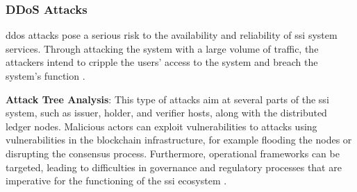 \subsubsection{DDoS Attacks}

\gls{ddos} attacks pose a serious risk to the availability and reliability of \gls{ssi} system services. Through attacking the system with a large 
volume of traffic, the attackers intend to cripple the users’ access to the system and breach the system’s function \cite{CyberSecurity}.

\textbf{Attack Tree Analysis}: This type of attacks aim at several parts of the \gls{ssi} system, such as issuer, holder, and verifier hosts, along with the distributed ledger nodes. 
Malicious actors can exploit vulnerabilities to attacks using vulnerabilities in the blockchain infrastructure, for example flooding the nodes or disrupting the consensus 
process. Furthermore, operational frameworks can be targeted, leading to difficulties in governance and regulatory processes that are imperative for the functioning of the 
\gls{ssi} ecosystem \cite{9659929}.